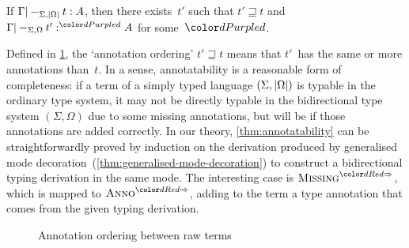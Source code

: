 \begin{proposition}[Annotatability]\label{thm:annotatability}
If\/ $\Gamma |-_{\Sigma,\left|\Omega\right|} t : A$, then there exists~$t'$ such that\/ $t' \sqsupseteq t$ and $\Gamma |-_{\Sigma,\Omega} t' :^\dir{d} A$ for some~$\dir{d}$.
\end{proposition}
Defined in \cref{fig:annotation-ordering}, the `annotation ordering' $t' \sqsupseteq t$ means that $t'$~has the same or more annotations than~$t$.
In a sense, annotatability is a reasonable form of completeness: if a term of a simply typed language $(\Sigma, \left|\Omega\right|)$ is typable in the ordinary type system, it may not be directly typable in the bidirectional type system $(\Sigma, \Omega)$ due to some missing annotations, but will be if those annotations are added correctly.
In our theory, \cref{thm:annotatability} can be straightforwardly proved by induction on the derivation produced by generalised mode decoration~(\cref{thm:generalised-mode-decoration}) to construct a bidirectional typing derivation in the same mode.
The interesting case is $\SynRule{Missing}$, which is mapped to $\SynRule{Anno}$, adding to the term a type annotation that comes from the given typing derivation.
\begin{figure}
  \centering\small
  \caption{Annotation ordering between raw terms}
  \label{fig:annotation-ordering}
\end{figure}


